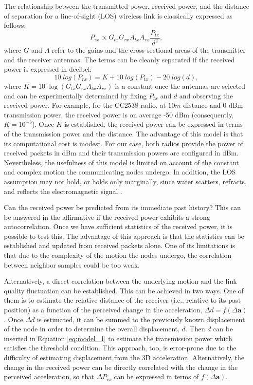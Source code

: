 The relationship between the transmitted power, received power, and the distance of separation for a line-of-sight (LOS) wireless link is classically expressed as follows: 
\begin{equation}
\label{eq:model_1}
P_{rx} \propto G_{tx} G_{rx} A_{tx} A_{rx} \frac{P_{tx}}{d^2},
\end{equation}
where $G$ and $A$ refer to the gains and the cross-sectional areas of the transmitter and the receiver antennas. The terms can be cleanly separated if the received power is expressed in decibel:
\begin{equation}
\label{eq:model_2}
10 \; log \left (P_{rx} \right ) =  K + 10 \; log \left ( P_{tx} \right ) - 20 \; log \left (d \right ),
\end{equation}
where $K = 10 \; \log \left (G_{tx} G_{rx} A_{tx} A_{rx} \right) $ is a constant once the antennas are selected and can be experimentally determined by fixing $P_{tx}$ and $d$ and observing the received power. For example, for the CC2538 radio, at $10m$ distance and 0 dBm transmission power, the received power is on average -50 dBm (consequently, $K = 10^{-3}$). Once $K$ is established, the received power can be expressed in terms of the transmission power and the distance. The advantage of this model is that its computational cost is modest. For our case, both radios provide the power of received packets in dBm and their transmission powers are configured in dBm. Nevertheless, the usefulness of this model is limited on account of the constant and complex motion the communicating nodes undergo. In addition, the LOS assumption may not hold, or holds only marginally, since  water scatters, refracts, and reflects the electromagnetic signal \cite{van2013propagation}.

Can the received power be predicted from its immediate past history? This can be answered in the affirmative if the received power exhibits a strong autocorrelation. Once we have sufficient statistics of the received power, it is possible to test this. The advantage of this approach is that the statistics can be established and updated from received packets alone. One of its limitations is that due to the complexity of the motion  the nodes undergo, the correlation between neighbor samples could be too weak. 

Alternatively, a direct correlation between the underlying motion and the link quality fluctuation can be established. This can be achieved in two ways. One of them is to estimate the relative distance of the receiver (i.e., relative to its past position) as a function of the perceived change in the acceleration, $\Delta d =  f( \Delta \textbf{a})$. Once $\Delta d$ is estimated, it can be summed to the previously known displacement of the node in order to determine the overall displacement, $d$. Then $d$ can be inserted in Equation \ref{eq:model_1} to estimate the transmission power which satisfies the threshold condition. This approach, too, is error-prone due to the difficulty of estimating displacement from the 3D acceleration. Alternatively, the change in the received power can be directly correlated with the change in the perceived acceleration, so that $\Delta P_{rx}$ can be expressed in terms of $ f(\Delta \textbf{a})$.  

